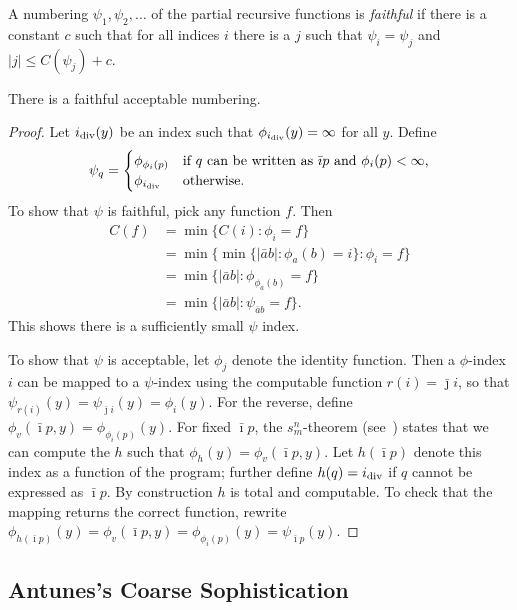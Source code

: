 \documentclass{style/llncs}
\newcommand{\tn}[1]{\textnormal{#1}}
\begin{document}
\begin{definition}\label{def:faithful}
  A numbering $\psi_1,\psi_2,\ldots$ of the partial recursive
  functions is \emph{faithful} if there is a constant $c$ such that
  for all indices $i$ there is a $j$ such that $\psi_i=\psi_j$ and
  $|j|\le C(\psi_j)+c$.
\end{definition}

\begin{lemma}
  There is a faithful acceptable numbering.
\end{lemma}
\begin{proof}
Let $i_\tn{div}(y)$ be an index such that $\phi_{i_\tn{div}}(y)=\infty$ for all $y$. Define
  \[\psi_q=\begin{cases}
    \phi_{\phi_i(p)}&\tn{if $q$ can be written as $\bar\imath p$ and $\phi_i(p)<\infty$,}\\
    \phi_{i_\tn{div}}&\tn{otherwise.}\end{cases}
  \]
  To show that $\psi$ is faithful, pick any function $f$. Then
\[\begin{split}
C(f)&=\min\{C(i):\phi_i=f\}\\
&=\min\{\min\{|\bar a b|:\phi_a(b)=i\}:\phi_i=f\}\\
&=\min\{|\bar a b|:\phi_{\phi_a(b)}=f\}\\
&=\min\{|\bar a b|:\psi_{\bar a b}=f\}.
\end{split}\]
This shows there is a sufficiently small $\psi$ index.

To show that $\psi$ is acceptable, let $\phi_j$ denote the identity
function. Then a $\phi$-index $i$ can be mapped to a $\psi$-index
using the computable function $r(i)=\bar\jmath i$, so that
$\psi_{r(i)}(y)=\psi_{\bar\jmath i}(y)=\phi_i(y)$. For the reverse,
define $\phi_v(\bar\imath p, y)=\phi_{\phi_i(p)}(y)$. For fixed
$\bar\imath p$, the 
$s^n_m$-theorem (see~\cite{TODO}) states that we can compute the $h$
such that $\phi_h(y)=\phi_v(\bar\imath p,y)$. Let $h(\bar\imath p)$
denote this index as a function of the program; further define
$h(q)=i_\tn{div}$ if $q$ cannot be expressed as $\bar\imath p$. By
construction $h$ is total and computable. To check that the mapping
returns the correct function, rewrite $\phi_{h(\bar\imath
  p)}(y)=\phi_v(\bar\imath p,y)=\phi_{\phi_i(p)}(y)=\psi_{\bar\imath p}(y)$.
\end{proof}

\subsection{Antunes's Coarse Sophistication}
\end{document}

